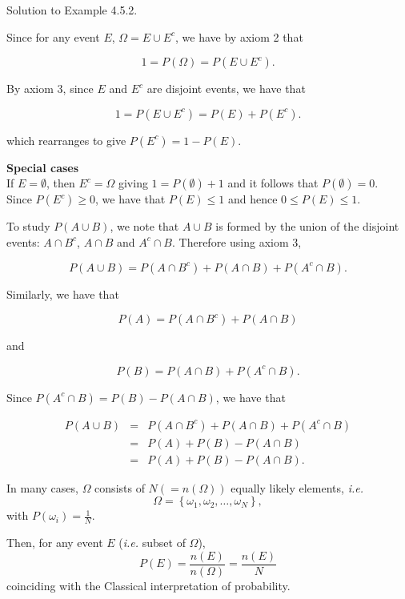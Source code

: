\documentclass[
]{book}
\begin{document}
Solution to Example 4.5.2.

Since for any event \(E\), \(\Omega = E \cup E^c\), we have by axiom 2 that

\[ 1 = P (\Omega) = P (E \cup E^c).  \]

By axiom 3, since \(E\) and \(E^c\) are disjoint events, we have that

\[ 1 = P (E \cup E^c)= P (E) + P (E^c).  \]

which rearranges to give \(P(E^c) = 1-P(E)\).

\textbf{Special cases}\\
If \(E = \emptyset\), then \(E^c = \Omega\) giving \(1 = P(\emptyset) +1\) and it follows that \(P(\emptyset)=0\).\\
Since \(P(E^c) \geq 0\), we have that \(P(E) \leq 1\) and hence \(0\leq P(E) \leq 1\).

To study \(P(A \cup B)\), we note that \(A \cup B\) is formed by the union of the disjoint events: \(A \cap B^c\), \(A \cap B\) and \(A^c \cap B\). Therefore using axiom 3,

\[ P(A \cup B) = P(A \cap B^c) + P(A \cap B)+P(A^c \cap B).   \]

Similarly, we have that

\[ P(A) = P(A \cap B^c) + P(A \cap B)\]

and

\[ P(B) =P(A \cap B)+P(A^c \cap B).\]

Since \(P(A^c \cap B) = P(B)-P(A \cap B)\), we have that

\begin{eqnarray*} P(A \cup B) &=& P(A \cap B^c) + P(A \cap B) + P(A^c \cap B)  \\
&=& P(A) + P(B)-P(A \cap B)   \\
&=& P(A) + P(B)-P(A \cap B).
\end{eqnarray*}

\hfill\break

In many cases, \(\Omega\) consists of \(N (=n(\Omega))\) equally likely elements, \emph{i.e.}
\[
\Omega = \left\{ \omega_{1}, \omega_{2}, \ldots, \omega_{N} \right\}, 
\]
with \(P(\omega_i) = \frac{1}{N}\).

Then, for any event \(E\) (\emph{i.e.} subset of \(\Omega\)),
\[
P(E) = \frac{n(E)}{n(\Omega)} = \frac{n(E)}{N}
\]
coinciding with the Classical interpretation of probability.
\end{document}
